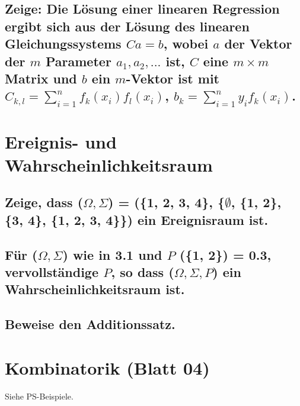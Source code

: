 \documentclass[a4paper,10pt]{article}
\begin{document}
\subsection{Zeige: Die Lösung einer linearen Regression ergibt sich aus der Lösung des linearen Gleichungssystems $C a = b$, wobei $a$ der Vektor der $m$ Parameter $a_1 , a_2 , . . .$ ist, $C$ eine $m × m$ Matrix und $b$ ein $m$-Vektor ist mit\newline
$C_{k,l}=\sum\limits_{i=1}^n f_k (x_i)f_l (x_i)$, $b_k = \sum\limits_{i=1}^n y_i f_k (x_i)$.}

\newpage
\section{Ereignis- und Wahrscheinlichkeitsraum}
\subsection{Zeige, dass ($\Omega, \Sigma$) = (\{1, 2, 3, 4\}, \{$\emptyset$, \{1, 2\}, \{3, 4\}, \{1, 2, 3, 4\}\}) ein Ereignisraum ist.}

\subsection{Für ($\Omega, \Sigma$) wie in 3.1 und $P$ (\{1, 2\}) = 0.3, \\ vervollständige $P$, so dass ($\Omega, \Sigma, P$) ein Wahrscheinlichkeitsraum ist.}

\subsection{Beweise den Additionssatz.}

\newpage
\section{Kombinatorik (Blatt 04)} %
Siehe PS-Beispiele.
\subsection{}

\subsection{}
\end{document}
